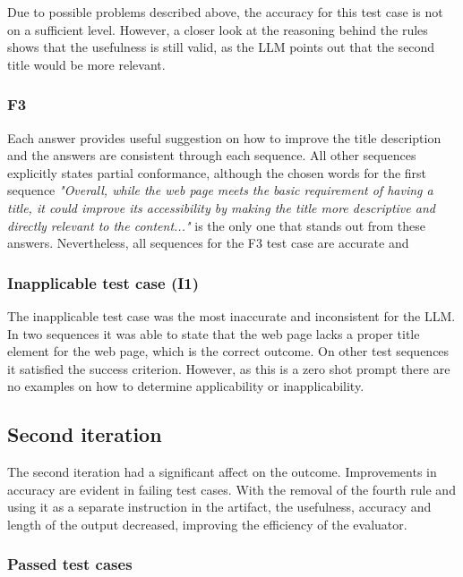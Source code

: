 Due to possible problems described above, the accuracy for this test case is not on a sufficient level. However, a closer look at the reasoning behind the rules shows that the usefulness is still valid, as the LLM points out that the second title would be more relevant.

\subsubsection{F3}

Each answer provides useful suggestion on how to improve the title description and the answers are consistent through each sequence. All other sequences explicitly states partial conformance, although the chosen words for the first sequence \textit{"Overall, while the web page meets the basic requirement of having a title, it could improve its accessibility by making the title more descriptive and directly relevant to the content..."} is the only one that stands out from these answers. Nevertheless, all sequences for the F3 test case are accurate and 

\subsubsection{Inapplicable test case (I1)}

The inapplicable test case was the most inaccurate and inconsistent for the LLM. In two sequences it was able to state that the web page lacks a proper title element for the web page, which is the correct outcome. On other test sequences it satisfied the success criterion. However, as this is a zero shot prompt there are no examples on how to determine applicability or inapplicability.


\subsection{Second iteration}

The second iteration had a significant affect on the outcome. Improvements in accuracy are evident in failing test cases. With the removal of the fourth rule and using it as a separate instruction in the artifact, the usefulness, accuracy and length of the output decreased, improving the efficiency of the evaluator.

\subsubsection{Passed test cases}

